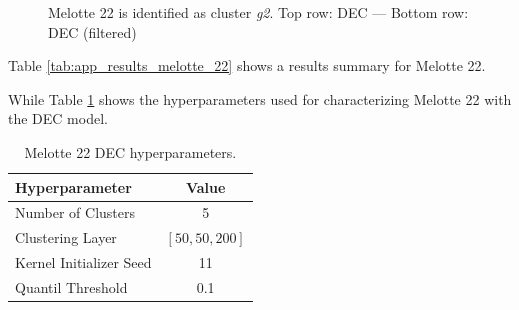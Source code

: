 \documentclass[11pt,a4paper,english,twocolumn]{article}
\begin{document}
\begin{figure}[htbp]
\begin{subfigure}{\columnwidth}
\begin{subfigure}[t]{0.30\textwidth}
    \end{subfigure}
  \end{subfigure}
  \caption{Melotte 22 is identified as cluster \emph{g2}.
           Top row: DEC --- Bottom row: DEC (filtered)}
  \label{fig:app_result_melotte_22_dec}
\end{figure}

Table \ref{tab:app_results_melotte_22} shows a results summary for Melotte 22.

\begin{table}[htbp]
  \begin{center}
    \caption{Melotte 22 results.}
    \label{tab:app_results_melotte_22}
  \end{center}
\end{table}

While Table \ref{tab:app_hyperparameters_melotte_22} shows the hyperparameters
used for characterizing Melotte 22 with the DEC model.

\begin{table}[hbtp]
  \begin{center}
    \begin{tabular}{l|c}
      \textbf{Hyperparameter} & \textbf{Value} \\
      \hline
      Number of Clusters & 5 \\
      Clustering Layer & $\left[ 50, 50, 200 \right]$ \\
      Kernel Initializer Seed & 11 \\
      Quantil Threshold & 0.1 \\
    \end{tabular}
    \caption{Melotte 22 DEC hyperparameters.}
    \label{tab:app_hyperparameters_melotte_22}
  \end{center}
\end{table}

\renewcommand{\refname}{REFERENCES}


\end{document}
